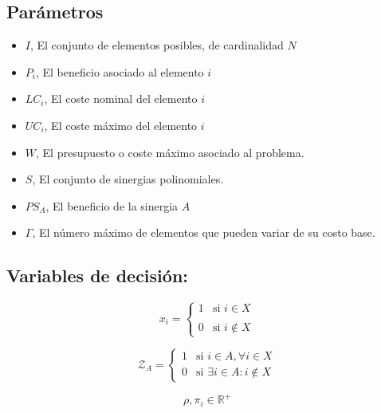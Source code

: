 \documentclass[spanish, a4paper, 12pt, openany,final]{book}
\begin{document}
    \subsection{Parámetros}
     \begin{itemize}
    	\item $I$, El conjunto de elementos posibles, de cardinalidad $N$
    	\item $P_i$, El beneficio asociado al elemento $i$ %
    	\item $LC_i$, El coste nominal del elemento $i$    %
    	\item $UC_i$, El coste máximo del elemento $i$     %
    	\item $W$, El presupuesto o coste máximo asociado al problema.
    	\item $S$, El conjunto de sinergias polinomiales.
    	\item $PS_A$, El beneficio de la sinergia $A$
    	\item $\Gamma$, El número máximo de elementos que pueden variar de su costo base.
    	
    	
    \end{itemize}
    
 	\subsection{Variables de decisión:}

    \begin{equation}
    	\label{equ:x_def}
    	x_i = \left\{ 
    	\begin{array}{lc}
    		1 & \text{si  $i\in X$}\\ \\ 
    		0 &  \text{si $i \notin X$}
    	\end{array} \right.
    \end{equation}
    
    \begin{equation}
    	\label{equ:z_def}
    	\mathcal{Z}_A = \left\{ 
    	\begin{array}{lc}
    		1 & \text{si  $i\in A,  \forall i \in X$}\\
    		0 &  \text{si $\exists i\in A: i \notin X$}
    	\end{array} \right.
    \end{equation}

    
    \begin{equation}
    	\label{equ:pi_def}
    	\rho,\pi_i \in \mathbb{R}^+
    \end{equation}
    
\end{document}
